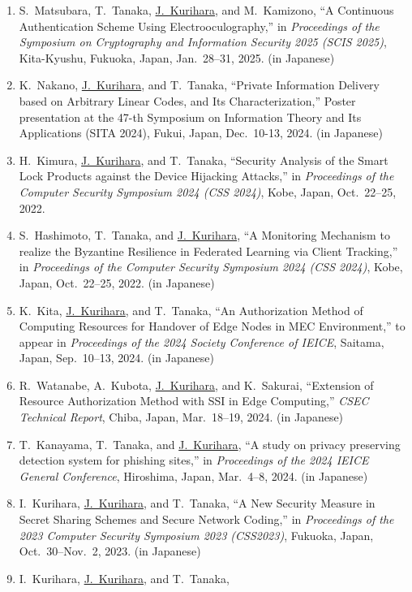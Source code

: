 \begin{enumerate}
 \item S.~Matsubara, T.~Tanaka, \underline{J.~Kurihara}, and M.~Kamizono, ``A Continuous Authentication Scheme Using Electrooculography,'' in \textit{Proceedings of the Symposium on Cryptography and Information Security 2025 (SCIS 2025)}, Kita-Kyushu, Fukuoka, Japan, Jan.~28--31, 2025. (in Japanese)
 \item K.~Nakano, \underline{J.~Kurihara}, and T.~Tanaka, ``Private Information Delivery based on Arbitrary Linear Codes, and Its Characterization,'' Poster presentation at the 47-th Symposium on Information Theory and Its Applications (SITA 2024), Fukui, Japan, Dec.~10-13, 2024. (in Japanese)
 \item H.~Kimura, \underline{J.~Kurihara}, and T.~Tanaka, ``Security Analysis of the Smart Lock Products against the Device Hijacking Attacks,'' in \textit{Proceedings of the Computer Security Symposium 2024 (CSS 2024)}, Kobe, Japan, Oct.~22--25, 2022.
 \item S.~Hashimoto, T.~Tanaka, and \underline{J.~Kurihara}, ``A Monitoring Mechanism to realize the Byzantine Resilience in Federated Learning via Client Tracking,'' in \textit{Proceedings of the Computer Security Symposium 2024 (CSS 2024)}, Kobe, Japan, Oct.~22--25, 2022. (in Japanese)
 \item K.~Kita, \underline{J.~Kurihara}, and T.~Tanaka, ``An Authorization Method of Computing Resources for Handover of Edge Nodes in MEC Environment,'' to appear in \textit{Proceedings of the 2024 Society Conference of IEICE}, Saitama, Japan, Sep.~10--13, 2024. (in Japanese)
 \item R.~Watanabe, A.~Kubota, \underline{J.~Kurihara}, and K.~Sakurai, ``Extension of Resource Authorization Method with SSI in Edge Computing,'' \textit{CSEC Technical Report}, Chiba, Japan, Mar.~18--19, 2024. (in Japanese)
 \item T.~Kanayama, T.~Tanaka, and \underline{J.~Kurihara}, ``A study on privacy preserving detection system for phishing sites,'' in \textit{Proceedings of the 2024 IEICE General Conference},
       Hiroshima, Japan, Mar.~4--8, 2024. (in Japanese)
 \item I.~Kurihara, \underline{J.~Kurihara}, and T.~Tanaka,
       ``A New Security Measure in Secret Sharing Schemes and Secure Network Coding,''
       in \textit{Proceedings of the 2023 Computer Security Symposium 2023 (CSS2023)},
       Fukuoka, Japan, Oct.~30--Nov.~2, 2023. (in Japanese)
 \item I.~Kurihara, \underline{J.~Kurihara}, and T.~Tanaka,

\end{enumerate}
